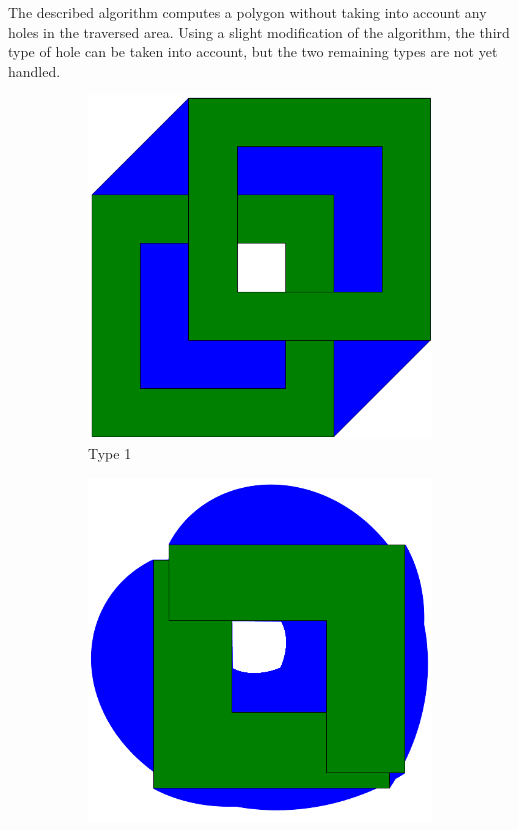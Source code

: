 The described algorithm computes a polygon without taking into account any holes in the traversed area. Using a slight modification of the algorithm, the third type of hole can be taken into account, but the two remaining types are not yet handled.

\begin{figure}[h!]
    \centering
    \begin{subfigure}{.3\textwidth}
        \centering
        \includegraphics[width=\textwidth]{images/hole_1.pdf}
        \caption{Type 1}
        \label{fig:hole_type_1}
    \end{subfigure}
    \hfill
    \begin{subfigure}{.3\textwidth}
        \centering
        \includegraphics[width=\textwidth]{images/hole_2.pdf}

\end{subfigure}
\end{figure}
